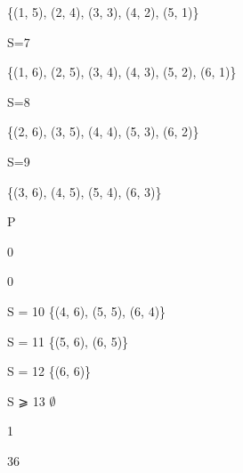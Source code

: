 \documentclass[a4paper,portrait,12pt]{article}
\begin{document}
\{(1, 5), (2, 4), (3, 3), (4, 2), (5, 1)\}





\begin{flushleft}
S=7
\end{flushleft}





\{(1, 6), (2, 5), (3, 4), (4, 3), (5, 2), (6, 1)\}





\begin{flushleft}
S=8
\end{flushleft}





\{(2, 6), (3, 5), (4, 4), (5, 3), (6, 2)\}





\begin{flushleft}
S=9
\end{flushleft}





\{(3, 6), (4, 5), (5, 4), (6, 3)\}





\begin{flushleft}
P
\end{flushleft}


0


0





\begin{flushleft}
S = 10 \{(4, 6), (5, 5), (6, 4)\}
\end{flushleft}


\begin{flushleft}
S = 11 \{(5, 6), (6, 5)\}
\end{flushleft}


\begin{flushleft}
S = 12 \{(6, 6)\}
\end{flushleft}


\begin{flushleft}
S ⩾ 13 $\emptyset$
\end{flushleft}





1


36
\end{document}
